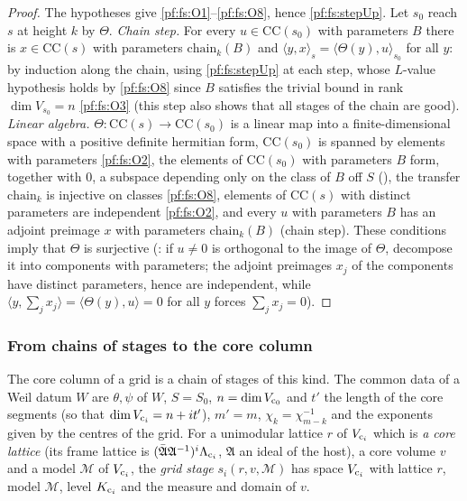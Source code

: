\begin{proof}
The hypotheses give \ref{pf:fs:O1}--\ref{pf:fs:O8}, hence \cref{pf:fs:stepUp}. Let $s_0$ reach $s$ at height $k$ by $\Theta$.
\emph{Chain step.} For every $u\in\mathrm{CC}(s_0)$ with parameters $B$ there is $x\in\mathrm{CC}(s)$ with parameters
$\mathrm{chain}_k(B)$ and $\langle y,x\rangle_s=\langle\Theta(y),u\rangle_{s_0}$ for all $y$: by induction along the chain, using
\cref{pf:fs:stepUp} at each step, whose $L$-value hypothesis holds by \ref{pf:fs:O8} since $B$ satisfies the trivial bound in rank
$\dim V_{s_0}=n$ \ref{pf:fs:O3} (this step also shows that all stages of the chain are
good). \emph{Linear algebra.} $\Theta\colon\mathrm{CC}(s)\to\mathrm{CC}(s_0)$ is a linear map into a finite-dimensional space with a
positive definite hermitian form, $\mathrm{CC}(s_0)$ is spanned by elements with parameters \ref{pf:fs:O2}, the elements of
$\mathrm{CC}(s_0)$ with parameters $B$ form, together with $0$, a subspace depending only on the class of $B$ off $S$
(), the transfer $\mathrm{chain}_k$ is injective on classes
\ref{pf:fs:O8}, elements of $\mathrm{CC}(s)$ with distinct parameters are independent \ref{pf:fs:O2}, and every $u$ with parameters $B$
has an adjoint preimage $x$ with parameters $\mathrm{chain}_k(B)$ (chain step). These conditions imply that $\Theta$ is surjective
(: if $u\ne0$ is orthogonal to the image of $\Theta$, decompose
it into components with parameters; the adjoint preimages $x_j$ of the components have distinct parameters, hence are independent,
while $\langle y,\sum_jx_j\rangle=\langle\Theta(y),u\rangle=0$ for all $y$ forces $\sum_jx_j=0$).
\end{proof}

\subsubsection{From chains of stages to the core column}

The core column of a grid is a chain of stages of this kind. The common data of a Weil datum $W$ are $\theta,\psi$ of $W$,
$S=S_0$, $n=\dim V_{\mathrm{c}_0}$ and $t'$ the length of the core segments (so that $\dim V_{\mathrm{c}_i}=n+it'$), $m'=m$,
$\chi_k=\chi_{m-k}^{-1}$ and the exponents given by the centres of the grid. For a unimodular lattice $r$ of $V_{\mathrm{c}_i}$ which is
\emph{a core lattice} (its frame lattice is $(\bar{\mathfrak A}\mathfrak A^{-1})^i\Lambda_{\mathrm{c}_i}$, $\mathfrak A$ an ideal of the host), a
core volume $v$ and a model $\mathcal M$ of $V_{\mathrm{c}_i}$, the \emph{grid stage} $s_i(r,v,\mathcal M)$ has space $V_{\mathrm{c}_i}$ with
lattice $r$, model $\mathcal M$, level $K_{\mathrm{c}_i}$ and the measure and domain of $v$.

